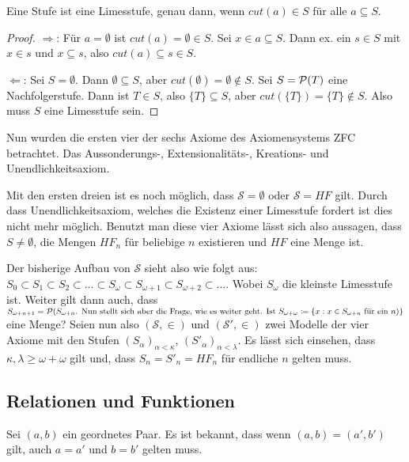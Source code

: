 \begin{satz}
	Eine Stufe ist eine Limesstufe, genau dann, wenn $cut(a)\in S$ für alle $a\subseteq S$.
\end{satz}
\begin{proof}
	$\Rightarrow$: Für $a=\emptyset$ ist $cut(a)=\emptyset \in S$. Sei $x \in a \subseteq S$. Dann ex. ein $s\in S$ mit $x\in s$ und $x\subseteq s$, also $cut(a)\subseteq s \in S$.
	
	$\Leftarrow$: Sei $S=\emptyset$. Dann $\emptyset\subseteq S$, aber $cut(\emptyset)=\emptyset\notin S$. 
	Sei $S=\mathcal{P}(T)$ eine Nachfolgerstufe. Dann ist $T\in S$, also $\{T\}\subseteq S$, aber $cut(\{T\})=\{T\}\notin S$. Also muss $S$ eine Limesstufe sein.
\end{proof}


Nun wurden die ersten vier der sechs Axiome des Axiomensystems ZFC betrachtet. Das Aussonderungs-, Extensionalitäts-, Kreations- und Unendlichkeitsaxiom.

Mit den ersten dreien ist es noch möglich, dass $\mathcal{S}=\emptyset$ oder $\mathcal{S}=HF$ gilt. Durch dass Unendlichkeitsaxiom, welches die Existenz einer Limesstufe fordert ist dies nicht mehr möglich. 
Benutzt man diese vier Axiome lässt sich also aussagen, dass $S\neq \emptyset$, die Mengen $HF_n$ für beliebige $n$ existieren und $HF$ eine Menge ist.

Der bisherige Aufbau von $\mathcal{S}$ sieht also wie folgt aus: $S_0\subset S_1\subset S_2 \subset \dots \subset S_\omega \subset S_{\omega+1}\subset S_{\omega+2}\subset \dots$. Wobei $S_\omega$ die kleinste Limesstufe ist. Weiter gilt dann auch, dass $S_{\omega+n+1}=\Pot{S_{\omega+n}$. 
	
Nun stellt sich aber die Frage, wie es weiter geht. Ist $S_{\omega+\omega}\coloneqq\{x : x\in S_{\omega+n} \text{ für ein } n}\}$ eine Menge? Seien nun also $(\mathcal{S}, \in)$ und $(\mathcal{S}', \in)$ zwei Modelle der vier Axiome mit den Stufen $(S_\alpha)_{\alpha<\kappa}$, $(S'_\alpha)_{\alpha<\lambda}$. Es lässt sich einsehen, dass $\kappa,\lambda \geq \omega+\omega$ gilt und, dass $S_n=S'_n=HF_n$ für endliche $n$ gelten muss.

\subsection{Relationen und Funktionen}

Sei $(a,b)$ ein geordnetes Paar. Es ist bekannt, dass wenn $(a,b)=(a', b')$ gilt, auch $a=a'$ und $b=b'$ gelten muss.

